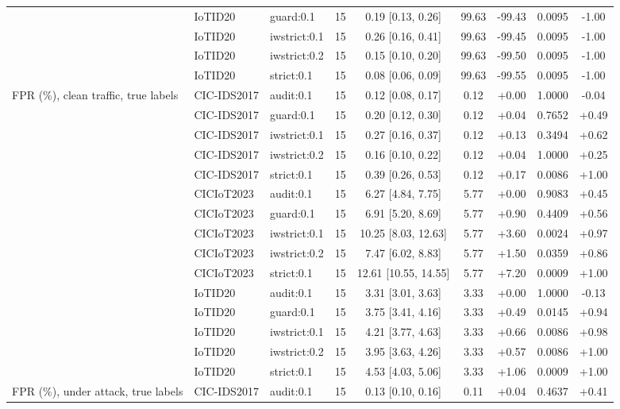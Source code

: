 \begin{table}[t]
\begin{tabular}{lllcccccc}
 & IoTID20 & guard:0.1 & 15 & 0.19 [0.13, 0.26] & 99.63 & -99.43 & 0.0095 & -1.00 \\
 & IoTID20 & iwstrict:0.1 & 15 & 0.26 [0.16, 0.41] & 99.63 & -99.45 & 0.0095 & -1.00 \\
 & IoTID20 & iwstrict:0.2 & 15 & 0.15 [0.10, 0.20] & 99.63 & -99.50 & 0.0095 & -1.00 \\
 & IoTID20 & strict:0.1 & 15 & 0.08 [0.06, 0.09] & 99.63 & -99.55 & 0.0095 & -1.00 \\
FPR (\%), clean traffic, true labels & CIC-IDS2017 & audit:0.1 & 15 & 0.12 [0.08, 0.17] & 0.12 & +0.00 & 1.0000 & -0.04 \\
 & CIC-IDS2017 & guard:0.1 & 15 & 0.20 [0.12, 0.30] & 0.12 & +0.04 & 0.7652 & +0.49 \\
 & CIC-IDS2017 & iwstrict:0.1 & 15 & 0.27 [0.16, 0.37] & 0.12 & +0.13 & 0.3494 & +0.62 \\
 & CIC-IDS2017 & iwstrict:0.2 & 15 & 0.16 [0.10, 0.22] & 0.12 & +0.04 & 1.0000 & +0.25 \\
 & CIC-IDS2017 & strict:0.1 & 15 & 0.39 [0.26, 0.53] & 0.12 & +0.17 & 0.0086 & +1.00 \\
 & CICIoT2023 & audit:0.1 & 15 & 6.27 [4.84, 7.75] & 5.77 & +0.00 & 0.9083 & +0.45 \\
 & CICIoT2023 & guard:0.1 & 15 & 6.91 [5.20, 8.69] & 5.77 & +0.90 & 0.4409 & +0.56 \\
 & CICIoT2023 & iwstrict:0.1 & 15 & 10.25 [8.03, 12.63] & 5.77 & +3.60 & 0.0024 & +0.97 \\
 & CICIoT2023 & iwstrict:0.2 & 15 & 7.47 [6.02, 8.83] & 5.77 & +1.50 & 0.0359 & +0.86 \\
 & CICIoT2023 & strict:0.1 & 15 & 12.61 [10.55, 14.55] & 5.77 & +7.20 & 0.0009 & +1.00 \\
 & IoTID20 & audit:0.1 & 15 & 3.31 [3.01, 3.63] & 3.33 & +0.00 & 1.0000 & -0.13 \\
 & IoTID20 & guard:0.1 & 15 & 3.75 [3.41, 4.16] & 3.33 & +0.49 & 0.0145 & +0.94 \\
 & IoTID20 & iwstrict:0.1 & 15 & 4.21 [3.77, 4.63] & 3.33 & +0.66 & 0.0086 & +0.98 \\
 & IoTID20 & iwstrict:0.2 & 15 & 3.95 [3.63, 4.26] & 3.33 & +0.57 & 0.0086 & +1.00 \\
 & IoTID20 & strict:0.1 & 15 & 4.53 [4.03, 5.06] & 3.33 & +1.06 & 0.0009 & +1.00 \\
FPR (\%), under attack, true labels & CIC-IDS2017 & audit:0.1 & 15 & 0.13 [0.10, 0.16] & 0.11 & +0.04 & 0.4637 & +0.41 \\

\end{tabular}
\end{table}
